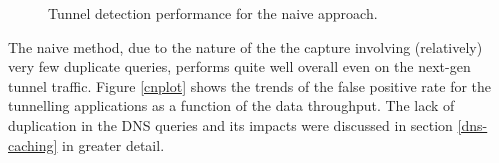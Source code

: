 \documentclass{llncs}
\begin{document}

\begin{figure}[h]
\centering
{}
\caption{Tunnel detection performance for the naive approach.}
\label{mpn}
\end{figure}

The naive method, due to the nature of the the capture involving (relatively)
very few duplicate queries, performs quite well overall even on the next-gen
tunnel traffic. Figure \ref{cnplot} shows the trends of the false positive rate
for the tunnelling applications as a function of the data throughput. The lack
of duplication in the DNS queries and its impacts were discussed in section
\ref{dns-caching} in greater detail.
\end{document}
